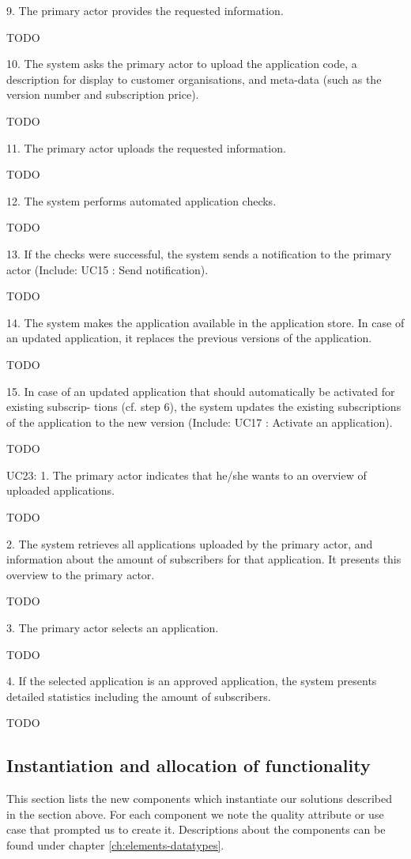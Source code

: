         9. The primary actor provides the requested information.

            TODO

        10. The system asks the primary actor to upload the application code, a description for display to customer organisations, and meta-data (such as the version number and subscription price).

            TODO

        11. The primary actor uploads the requested information.

            TODO

        12. The system performs automated application checks.

            TODO

        13. If the checks were successful, the system sends a notification to the primary actor (Include: UC15 : Send notification).

            TODO

        14. The system makes the application available in the application store. In case of an updated application, it replaces the previous versions of the application.

            TODO

        15. In case of an updated application that should automatically be activated for existing subscrip- tions (cf. step 6), the system updates the existing subscriptions of the application to the new version (Include: UC17 : Activate an application).

            TODO


    UC23:
        1. The primary actor indicates that he/she wants to an overview of uploaded applications.

            TODO

        2. The system retrieves all applications uploaded by the primary actor, and information about the amount of subscribers for that application. It presents this overview to the primary actor.

            TODO

        3. The primary actor selects an application.

            TODO

        4. If the selected application is an approved application, the system presents detailed statistics including the amount of subscribers.

            TODO


\subsection{Instantiation and allocation of functionality}
    This section lists the new components which instantiate our solutions
    described in the section above. For each component we note the quality
    attribute or use case that prompted us to create it. Descriptions about
    the components can be found under chapter \ref{ch:elements-datatypes}. \\

